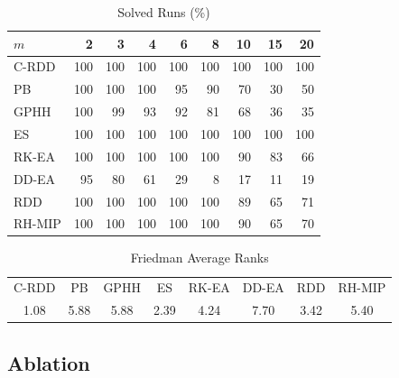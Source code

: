 \begin{table}[t]
  \centering
  \caption{Solved Runs (\%)}
  \label{tab:solve}
  \footnotesize
  \setlength{\tabcolsep}{4pt}
  \begin{tabular}{@{}lrrrrrrrr@{}}
    \toprule
    $m$ & 2 & 3 & 4 & 6 & 8 & 10 & 15 & 20 \\
    \midrule
C-RDD & 100 & 100 & 100 & 100 & 100 & 100 & 100 & 100 \\
PB & 100 & 100 & 100 & 95 & 90 & 70 & 30 & 50 \\
GPHH & 100 & 99 & 93 & 92 & 81 & 68 & 36 & 35 \\
ES & 100 & 100 & 100 & 100 & 100 & 100 & 100 & 100 \\
RK-EA & 100 & 100 & 100 & 100 & 100 & 90 & 83 & 66 \\
DD-EA & 95 & 80 & 61 & 29 & 8 & 17 & 11 & 19 \\
RDD & 100 & 100 & 100 & 100 & 100 & 89 & 65 & 71 \\
RH-MIP & 100 & 100 & 100 & 100 & 100 & 90 & 65 & 70 \\
    \bottomrule
  \end{tabular}
\end{table}

\begin{table}[t]
  \centering
  \caption{Friedman Average Ranks}
  \label{tab:rank}
  \footnotesize
  \setlength{\tabcolsep}{3pt}
  \begin{tabular}{@{}cccccccc@{}}
    \toprule
C-RDD & PB & GPHH & ES & RK-EA & DD-EA & RDD & RH-MIP \\
1.08 & 5.88 & 5.88 & 2.39 & 4.24 & 7.70 & 3.42 & 5.40 \\
    \bottomrule
  \end{tabular}
\end{table}

\subsection{Ablation}
\label{sec:exp:ablation}

\newcommand{\SEn}{240}\newcommand{\SEshort}{157}\newcommand{\SEpct}{65}\newcommand{\SEaddmin}{1}\newcommand{\SEaddmax}{10}\newcommand{\SEfail}{8}

